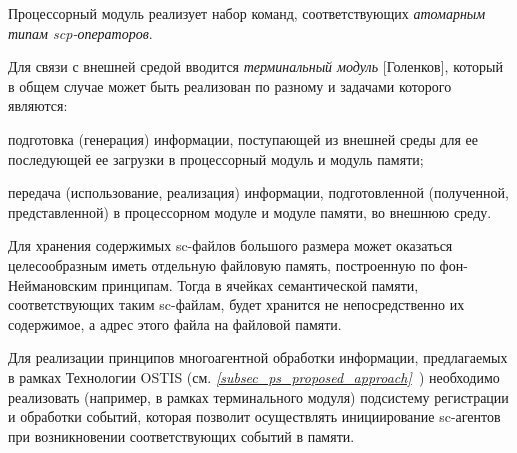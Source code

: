 \begin{textitemize}
	\item Процессорный модуль реализует набор команд, соответствующих \textit{атомарным типам scp-операторов}.
	\item Для связи с внешней средой вводится \textit{терминальный модуль} [Голенков], который в общем случае может быть реализован по разному и задачами которого являются:
	\begin{textitemize}
		\item подготовка (генерация) информации, поступающей из внешней среды для ее последующей ее загрузки в процессорный модуль и модуль памяти;
		\item передача (использование, реализация) информации, подготовленной (полученной, представленной) в процессорном модуле и модуле памяти, во внешнюю среду.
	\end{textitemize}
	\item Для хранения содержимых sc-файлов большого размера может оказаться целесообразным иметь отдельную файловую память, построенную по фон-Неймановским принципам. Тогда в ячейках семантической памяти, соответствующих таким sc-файлам, будет хранится не непосредственно их содержимое, а адрес этого файла на файловой памяти.
	\item Для реализации принципов многоагентной обработки информации, предлагаемых в рамках Технологии OSTIS (см. \textit{\ref{subsec_ps_proposed_approach}~}) необходимо реализовать (например, в рамках терминального модуля) подсистему регистрации и обработки событий, которая позволит осуществлять инициирование sc-агентов при возникновении соответствующих событий в памяти.
\end{textitemize}


